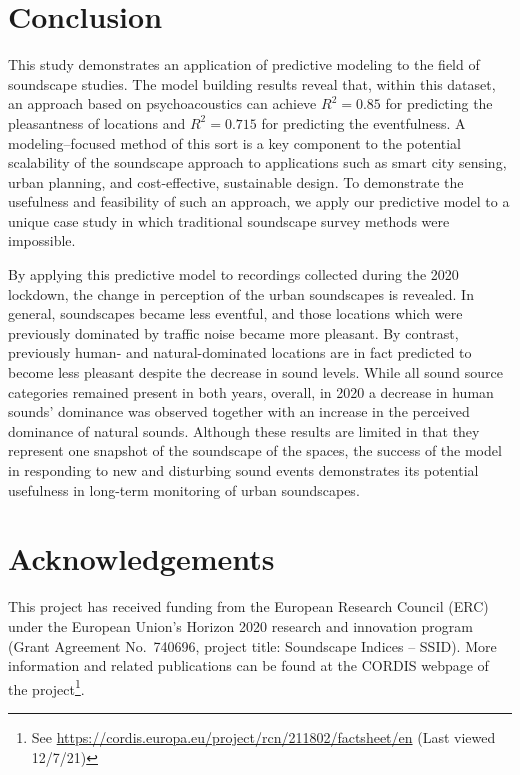 \documentclass[
  authoryear,
  preprint,
  3p,
  onecolumn]{elsarticle}
\begin{document}
\section{Conclusion}\label{conclusion}

This study demonstrates an application of predictive modeling to the
field of soundscape studies. The model building results reveal that,
within this dataset, an approach based on psychoacoustics can achieve
\(R^2 = 0.85\) for predicting the pleasantness of locations and
\(R^2 = 0.715\) for predicting the eventfulness. A modeling--focused
method of this sort is a key component to the potential scalability of
the soundscape approach to applications such as smart city sensing,
urban planning, and cost-effective, sustainable design. To demonstrate
the usefulness and feasibility of such an approach, we apply our
predictive model to a unique case study in which traditional soundscape
survey methods were impossible.

By applying this predictive model to recordings collected during the
2020 lockdown, the change in perception of the urban soundscapes is
revealed. In general, soundscapes became less eventful, and those
locations which were previously dominated by traffic noise became more
pleasant. By contrast, previously human- and natural-dominated locations
are in fact predicted to become less pleasant despite the decrease in
sound levels. While all sound source categories remained present in both
years, overall, in 2020 a decrease in human sounds' dominance was
observed together with an increase in the perceived dominance of natural
sounds. Although these results are limited in that they represent one
snapshot of the soundscape of the spaces, the success of the model in
responding to new and disturbing sound events demonstrates its potential
usefulness in long-term monitoring of urban soundscapes.

\section*{Acknowledgements}\label{acknowledgements}

This project has received funding from the European Research Council
(ERC) under the European Union's Horizon 2020 research and innovation
program (Grant Agreement No.~740696, project title: Soundscape Indices
-- SSID). More information and related publications can be found at the
CORDIS webpage of the project\footnote{See
  \url{https://cordis.europa.eu/project/rcn/211802/factsheet/en} (Last
  viewed 12/7/21)}.
\end{document}
